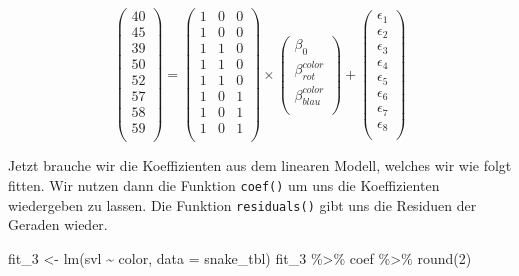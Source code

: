\documentclass[
  letterpaper,
]{scrbook}
\newenvironment{Shaded}{\begin{snugshade}}{\end{snugshade}}
\newcommand{\AttributeTok}[1]{\textcolor[rgb]{0.40,0.45,0.13}{#1}}
\newcommand{\DecValTok}[1]{\textcolor[rgb]{0.68,0.00,0.00}{#1}}
\newcommand{\FunctionTok}[1]{\textcolor[rgb]{0.28,0.35,0.67}{#1}}
\newcommand{\NormalTok}[1]{\textcolor[rgb]{0.00,0.23,0.31}{#1}}
\newcommand{\OtherTok}[1]{\textcolor[rgb]{0.00,0.23,0.31}{#1}}
\newcommand{\SpecialCharTok}[1]{\textcolor[rgb]{0.37,0.37,0.37}{#1}}
\begin{document}
\[
 \begin{pmatrix}
  40 \\
  45 \\
  39 \\
  50 \\
  52 \\
  57 \\
  58 \\
  59 \\
 \end{pmatrix}
 =
  \begin{pmatrix}
  1 & 0 & 0 \\
  1 & 0 & 0\\
  1 & 1 & 0\\
  1 & 1 & 0\\
  1 & 1 & 0\\
  1 & 0 & 1\\
  1 & 0 & 1\\
  1 & 0 & 1\\
 \end{pmatrix}
 \times
  \begin{pmatrix}
  \beta_0 \\
  \beta^{color}_{rot} \\
  \beta^{color}_{blau} \\
 \end{pmatrix} +
  \begin{pmatrix}
  \epsilon_1 \\
  \epsilon_2 \\
  \epsilon_3 \\
  \epsilon_4 \\
  \epsilon_5 \\
  \epsilon_6 \\
  \epsilon_7 \\
  \epsilon_8 \\
 \end{pmatrix}
\]

Jetzt brauche wir die Koeffizienten aus dem linearen Modell, welches wir
wie folgt fitten. Wir nutzen dann die Funktion \texttt{coef()} um uns
die Koeffizienten wiedergeben zu lassen. Die Funktion
\texttt{residuals()} gibt uns die Residuen der Geraden wieder.

\begin{Shaded}
\begin{Highlighting}[]
\NormalTok{fit\_3 }\OtherTok{\textless{}{-}} \FunctionTok{lm}\NormalTok{(svl }\SpecialCharTok{\textasciitilde{}}\NormalTok{ color, }\AttributeTok{data =}\NormalTok{ snake\_tbl) }
\NormalTok{fit\_3 }\SpecialCharTok{\%\textgreater{}\%}\NormalTok{ coef }\SpecialCharTok{\%\textgreater{}\%} \FunctionTok{round}\NormalTok{(}\DecValTok{2}\NormalTok{)}
\end{Highlighting}
\end{Shaded}
\end{document}
